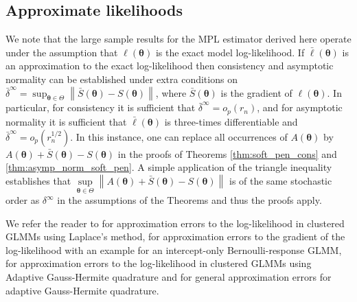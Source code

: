 \documentclass[11pt, a4paper]{article}
\newcommand*{\bb}{\boldsymbol}
\newcommand{\vnorm}[1]{\ensuremath{{\left\| #1 \right\|}}}
\theoremstyle{example} \newtheorem{example}{Example}[section]
\theoremstyle{theorem} \newtheorem{theorem}{Theorem}[section]
\def\btheta{\bb{\theta}}
\begin{document}
\subsection{Approximate likelihoods}

We note that the large sample results for the MPL estimator derived
here operate under the assumption that $\ell(\btheta)$ is the exact
model log-likelihood. If $\bar{\ell}(\btheta)$ is an approximation to
the exact log-likelihood then consistency and asymptotic normality can
be established under extra conditions on
$\bar\delta^\infty = \sup_{\btheta \in \Theta}\vnorm{ \bar{S}(\btheta)
  - S(\btheta) }$, where $\bar{S}(\btheta)$ is the gradient of
$\ell(\btheta)$. In particular, for consistency it is sufficient that
$\bar\delta^\infty = o_p(r_n)$, and for asymptotic normality it is
sufficient that $\bar{\ell}(\btheta)$ is three-times differentiable
and $\bar\delta^\infty = o_p(r_n^{1/2})$. In this instance, one can
replace all occurrences of $A(\btheta)$ by
$A(\btheta) + \bar{S}(\btheta)-S(\btheta)$ in the proofs of Theorems
\ref{thm:soft_pen_cons} and \ref{thm:asymp_norm_soft_pen}. A simple
application of the triangle inequality establishes that
$\underset{\btheta \in \Theta}{\sup} \vnorm{A(\btheta) +
  \bar{S}(\btheta)-S(\btheta)}$ is of the same stochastic order as
$\delta^\infty$ in the assumptions of the Theorems and thus the proofs
apply.

We refer the reader to \citet{ogden:2021} for approximation errors to
the log-likelihood in clustered GLMMs using Laplace's method,
\citet{ogden:2017} for approximation errors to the gradient of the
log-likelihood with an example for an intercept-only
Bernoulli-response GLMM, \citet{stringer:2022} for approximation
errors to the log-likelihood in clustered GLMMs using Adaptive
Gauss-Hermite quadrature and \citet{jin+andersson:2020} for general
approximation errors for adaptive Gauss-Hermite quadrature.
\end{document}
